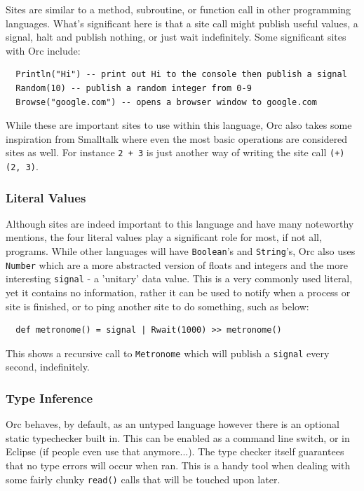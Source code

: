 \documentclass[12pt, letterpaper]{article}
\begin{document}
Sites are similar to a method, subroutine, or function call in other programming languages.  What's significant here is that a site call might publish useful values, a signal, halt and publish nothing, or just wait indefinitely.  Some significant sites with Orc include:
\begin{lstlisting}
  Println("Hi") -- print out Hi to the console then publish a signal
  Random(10) -- publish a random integer from 0-9
  Browse("google.com") -- opens a browser window to google.com
\end{lstlisting}
While these are important sites to use within this language, Orc also takes some inspiration from Smalltalk where even the most basic operations are considered sites as well.  For instance \texttt{2 + 3} is just another way of writing the site call \texttt{(+)(2, 3)}\cite{Cook2008}.

\subsubsection{Literal Values}

Although sites are indeed important to this language and have many noteworthy mentions, the four literal values play a significant role for most, if not all, programs.  While other languages will have \texttt{Boolean}'s and \texttt{String}'s, Orc also uses \texttt{Number} which are a more abstracted version of floats and integers and the more interesting \texttt{signal} - a 'unitary' data value.  This is a very commonly used literal, yet it contains no information, rather it can be used to notify when a process or site is finished, or to ping another site to do something\cite{UserGuide}, such as below: 

\begin{lstlisting}
  def metronome() = signal | Rwait(1000) >> metronome()
\end{lstlisting}

This shows a recursive call to \texttt{Metronome} which will publish a \texttt{signal} every second, indefinitely.

\subsubsection{Type Inference}
Orc behaves, by default, as an untyped language however there is an optional static typechecker built in.  This can be enabled as a command line switch, or in Eclipse (if people even use that anymore...).  The type checker itself guarantees that no type errors will occur when ran.  This is a handy tool when dealing with some fairly clunky \texttt{read()} calls that will be touched upon later.
\end{document}
